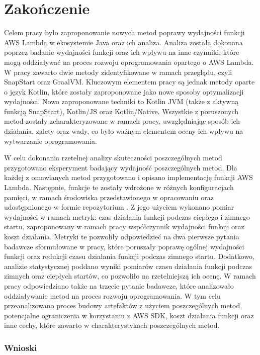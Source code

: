 \chapter*{Zakończenie}\label{chapter:zakonczenie}

Celem pracy było zaproponowanie nowych metod poprawy wydajności funkcji AWS Lambda w ekosystemie Java oraz ich analiza.
Analiza została dokonana poprzez badanie wydajności funkcji oraz ich wpływu na inne czynniki, które mogą oddziaływać na proces rozwoju oprogramowania opartego o AWS Lambda.
W pracy zawarto dwie metody zidentyfikowane w ramach przeglądu, czyli SnapStart oraz GraalVM.
Kluczowym elementem pracy są jednak metody oparte o język Kotlin, które zostały zaproponowane jako nowe sposoby optymalizacji wydajności.
Nowo zaproponowane techniki to Kotlin JVM (także z aktywną funkcją SnapStart), Kotlin/JS oraz Kotlin/Native.
Wszystkie z poruszonych metod zostały zcharakteryzowane w ramach pracy, uwzględniając sposób ich działania, zalety oraz wady, co było ważnym elementem oceny ich wpływu na wytwarzanie oprogramowania.

W celu dokonania rzetelnej analizy skuteczności poszczególnych metod przygotowano eksperyment badający wydajność poszczególnych metod.
Dla każdej z omawianych metod przygotowano i opisano implementację funkcji AWS Lambda.
Następnie, funkcje te zostały wdrożone w różnych konfiguracjach pamięci, w ramach środowiska przedstawionego w opracowaniu oraz udostępnionego w formie repozytorium \cite{RepozytoriumEksperyment}.
Z jego użyciem wykonano pomiar wydajności w ramach metryk: czas działania funkcji podczas ciepłego i zimnego startu, zaproponowany w ramach pracy współczynnik wydajności funkcji oraz koszt działania.
Metryki te pozwoliły odpowiedzieć na dwa pierwsze pytania badawcze sformułowane w pracy, które poruszały poprawę ogólnej wydajności funkcji oraz redukcji czasu działania funkcji podczas zimnego startu.
Dodatkowo, analizie statystycznej poddano wyniki pomiarów czasu działania funkcji podczas zimnych oraz ciepłych startów, co pozwoliło na rzetelniejszą ich ocenę.
W ramach pracy odpowiedziano także na trzecie pytanie badawcze, które analizowało oddziaływanie metod na proces rozwoju oprogramowania.
W tym celu przeanalizowano proces budowy artefaktów z użyciem poszczególnych metod, potencjalne ograniczenia w korzystaniu z AWS SDK, koszt działania funkcji oraz inne cechy, które zawarto w charakterystykach poszczególnych metod.

\subsection*{Wnioski}

